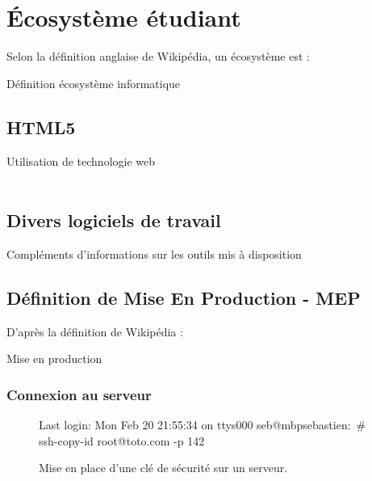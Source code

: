 \chapter{Écosystème  étudiant}
\label{chap:écosysteme}

Selon la définition anglaise de Wikipédia, un écosystème est : 

\begin{bclogo}[logo=\bctrombone, couleurBarre=yellow, couleur = blue!20, arrondi=0.5,marge=10, noborder=true,ombre=true, couleurOmbre=black!30,blur]{Définition écosystème informatique}
\lipsum[2]
\end{bclogo}

\lipsum[4]
\newpage
\section{HTML5}
Utilisation de technologie web~~ \\\\
\lipsum[4]


\section{Divers logiciels de travail}

\begin{bclogo}[logo=\bcattention, couleurBarre=red, couleur = blue!20, arrondi=0.5,marge=10, noborder=true,ombre=true, couleurOmbre=black!30,blur]{Compléments d'informations sur les outils mis à disposition}
\lipsum[4] 
\end{bclogo}

\section{Définition de  Mise En Production - MEP }

D'après la définition de Wikipédia \cite{Gestion_mise_en_production} : 

\begin{bclogo}[logo=\bctrombone, couleurBarre=yellow, couleur = blue!20, arrondi=0.5,marge=10, noborder=true,ombre=true, couleurOmbre=black!30,blur]{Mise en production}
\lipsum[4]
\end{bclogo}


\subsection{Connexion au serveur}


\lipsum[4]

\begin{figure}[H]
\begin{bash}
Last login: Mon Feb 20 21:55:34 on ttys000
seb@mbpsebastien:~# ssh-copy-id root@toto.com -p 142	
\end{bash}
\caption{Mise en place d'une clé de sécurité sur un serveur.}
\label{fig:keys}
\end{figure}
